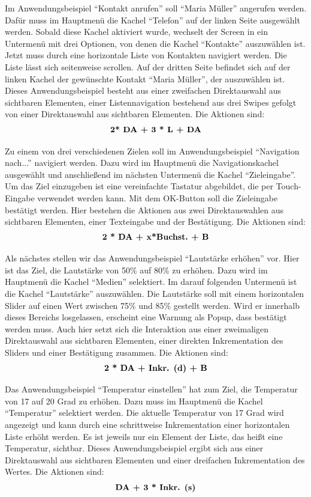 Im Anwendungsbeispiel "`Kontakt anrufen"' soll "`Maria Müller"' angerufen werden. Dafür muss im Hauptmenü die Kachel "`Telefon"' auf der linken Seite ausgewählt werden. 
Sobald diese Kachel aktiviert wurde, wechselt der Screen in ein Untermenü mit drei Optionen, von denen die Kachel "`Kontakte"' auszuwählen ist. 
Jetzt muss durch eine horizontale Liste von Kontakten navigiert werden. 
Die Liste lässt sich seitenweise scrollen. 
Auf der dritten Seite befindet sich auf der linken Kachel der gewünschte Kontakt "`Maria Müller"', der auszuwählen ist. 
Dieses Anwendungsbeispiel besteht aus einer zweifachen Direktauswahl aus sichtbaren Elementen, einer Listennavigation bestehend aus drei Swipes gefolgt von einer Direktauswahl aus sichtbaren Elementen. 
Die Aktionen sind:
$$\textbf{2* \text{DA} + 3 * \text{L} + \text{DA}}$$

Zu einem von drei verschiedenen Zielen soll im Anwendungsbeispiel "`Navigation nach..."' navigiert werden. 
Dazu wird im Hauptmenü die Navigationskachel ausgewählt und anschließend im nächsten Untermenü die Kachel "`Zieleingabe"'. 
Um das Ziel einzugeben ist eine vereinfachte Tastatur abgebildet, die per Touch-Eingabe verwendet werden kann. 
Mit dem OK-Button soll die Zieleingabe bestätigt werden. 
Hier bestehen die Aktionen aus zwei Direktauswahlen aus sichtbaren Elementen, einer Texteingabe und der Bestätigung. 
Die Aktionen sind:
$$\textbf{2 * \text{DA} + \text{x*Buchst.} + \text{B}}$$

Als nächstes stellen wir das Anwendungsbeispiel "`Lautstärke erhöhen"' vor. Hier ist das Ziel, die Lautstärke von 50\% auf 80\% zu erhöhen. 
Dazu wird im Hauptmenü die Kachel "`Medien"' selektiert. 
Im darauf folgenden Untermenü ist die Kachel "`Lautstärke"' auszuwählen. 
Die Lautstärke soll mit einem horizontalen Slider auf einen Wert zwischen 75\% und 85\% gestellt werden. 
Wird er innerhalb dieses Bereichs losgelassen, erscheint eine Warnung als Popup, dass bestätigt werden muss. 
Auch hier setzt sich die Interaktion aus einer zweimaligen Direktauswahl aus sichtbaren Elementen, einer direkten Inkrementation des Sliders und einer Bestätigung zusammen.
Die Aktionen sind:
$$\textbf{2 * \text{DA} + \text{Inkr. (d)} + \text{B}}$$

Das Anwendungsbeispiel "`Temperatur einstellen"' hat zum Ziel, die Temperatur von 17 auf 20 Grad zu erhöhen. 
Dazu muss im Hauptmenü die Kachel "`Temperatur"' selektiert werden. 
Die aktuelle Temperatur von 17 Grad wird angezeigt und kann durch eine schrittweise Inkrementation einer horizontalen Liste erhöht werden.
Es ist jeweils nur ein Element der Liste, das heißt eine Temperatur, sichtbar.
Dieses Anwendungsbeispiel ergibt sich aus einer Direktauswahl aus sichtbaren Elementen und einer dreifachen Inkrementation des Wertes. 
Die Aktionen sind:
$$\textbf{\text{DA} + 3 * \text{Inkr. (s)}}$$

